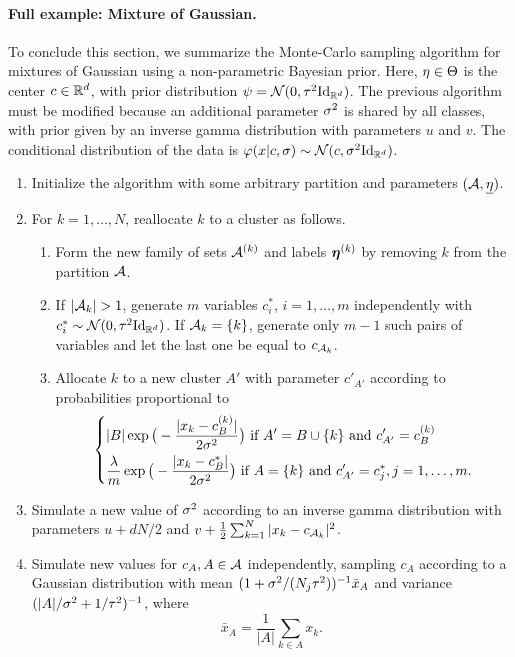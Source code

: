 \paragraph{Full example: Mixture of Gaussian.}
To conclude this section, we summarize the Monte-Carlo sampling algorithm for mixtures of Gaussian using a non-parametric Bayesian prior. Here, $\eta\in \Theta$ is the center $c \in {\mathbb{R}}^d $, with  prior distribution $\psi =  \CN(0, \tau^2\Id[d])$. The previous algorithm must be modified because an additional parameter $\sigma^2$ is shared by all classes, with prior given by an inverse gamma distribution with parameters $u$ and $v$. The conditional distribution of the data is $\phi(x|c, \sig) \sim \CN(c, \sig^2\Id[d])$. 

 
\begin{algorithm}
\label{alg:gs.MoG.full}
\begin{enumerate}[label=(\arabic*)]
\item Initialize the algorithm with some arbitrary partition and parameters $({\mathcal A}, {\underline{\eta}})$.
\item For $k=1, \ldots, N$, reallocate $k$ to a cluster as follows.   
\begin{enumerate}[label=(\roman*), wide=0.5cm]
\item Form the new family of sets ${\mathcal A}^{(k)}$ and labels ${\bm{\eta}}^{(k)}$ by removing $k$ from the partition ${\mathcal A}$.
\item If $|{\mathcal A}_k|  > 1$, generate $m$ variables $c^*_i$, $i=1, \ldots, m$ independently with $c^*_i \sim \CN(0, \tau^2\Id[d])$. If ${\mathcal A}_k= \{k\}$, generate only $m-1$ such pairs of variables and let the last one be equal to $c_{{\mathcal A}_k} $.
\item Allocate $k$ to a new cluster $A'$ with parameter $c'_{A'}$ according to probabilities proportional to  
\[
\left\{
\begin{aligned}
& |B|  \exp\big(-\frac{|x_k - c^{(k)}_B|}{2\sigma^2}\big) \text{ if } A' = B \cup \{k\} \text{ and } c'_{A'} = c^{(k)}_B\\
&\frac{\lambda}{m}  \exp\big(-\frac{|x_k - c^*_B|}{2\sigma^2}\big) \text{ if } A = \{k\}  \text{ and }   c'_{A'}  = c^*_j, j=1, \ldots, m.
\end{aligned}
\right.
\]
\end{enumerate}

\item Simulate  a new value of $\sigma^2$ according to an inverse gamma distribution with parameters $u+dN/2$ and $v + \frac12 \sum_{k=1}^N|x_k-c_{{\mathcal A}_k}|^2$. 
\item Simulate new values for  $c_A, A\in{\mathcal A}$ independently, sampling $c_A$ according to a Gaussian distribution with mean $(1 + \sigma^2/(N_j\tau^2))^{-1} \bar x_A$ and variance $(|A|/\sigma^2 + 1/\tau^2)^{-1}$, where
\[
\bar x_A = \frac1{|A|} \sum_{k\in A} x_k.
\] 
\end{enumerate}
\end{algorithm}

